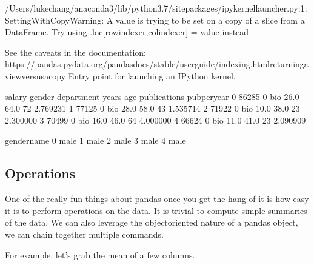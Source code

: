\documentclass[letterpaper,10pt,english]{sphinxmanual}
\begin{document}
\begin{sphinxVerbatim}[commandchars=\\\{\}]
/Users/lukechang/anaconda3/lib/python3.7/site\PYGZhy{}packages/ipykernel\PYGZus{}launcher.py:1: SettingWithCopyWarning: 
A value is trying to be set on a copy of a slice from a DataFrame.
Try using .loc[row\PYGZus{}indexer,col\PYGZus{}indexer] = value instead

See the caveats in the documentation: https://pandas.pydata.org/pandas\PYGZhy{}docs/stable/user\PYGZus{}guide/indexing.html\PYGZsh{}returning\PYGZhy{}a\PYGZhy{}view\PYGZhy{}versus\PYGZhy{}a\PYGZhy{}copy
  \PYGZdq{}\PYGZdq{}\PYGZdq{}Entry point for launching an IPython kernel.
\end{sphinxVerbatim}

\begin{sphinxVerbatim}[commandchars=\\\{\}]
   salary  gender department  years   age  publications  pub\PYGZus{}per\PYGZus{}year  \PYGZbs{}
0   86285       0        bio   26.0  64.0            72      2.769231   
1   77125       0        bio   28.0  58.0            43      1.535714   
2   71922       0        bio   10.0  38.0            23      2.300000   
3   70499       0        bio   16.0  46.0            64      4.000000   
4   66624       0        bio   11.0  41.0            23      2.090909   

  gender\PYGZus{}name  
0        male  
1        male  
2        male  
3        male  
4        male  
\end{sphinxVerbatim}


\subsection{Operations}
\label{\detokenize{content/Introduction_to_Pandas:operations}}
One of the really fun things about pandas once you get the hang of it is how easy it is to perform operations on the data. It is trivial to compute simple summaries of the data. We can also leverage the object\sphinxhyphen{}oriented nature of a pandas object, we can chain together multiple commands.

For example, let’s grab the mean of a few columns.

\begin{sphinxVerbatim}[commandchars=\\\{\}]
\PYG{p}{[}\PYG{p}{[}  \PYG{p}{]}\PYG{p}{]}
\end{sphinxVerbatim}
\end{document}
